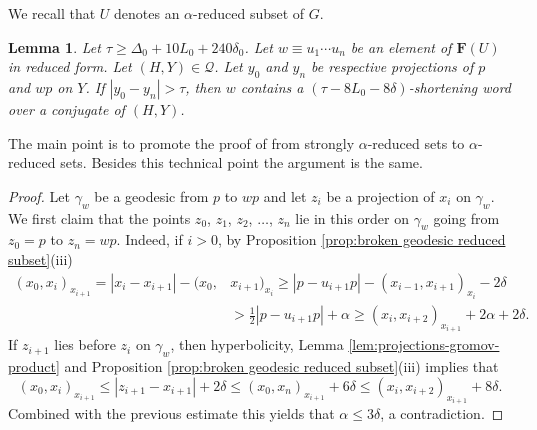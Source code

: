 \documentclass[leqno,a4paper,10pt]{amsart}
\theoremstyle{plain}
\newtheorem{lem}[thm]{Lemma}
\theoremstyle{definition}
\theoremstyle{remark}
\renewcommand{\geq}{\geqslant}
\newcommand{\F}{\mathbf{F}}
\newcommand{\scrQ}{\mathscr{Q}}
\let\geq\geqslant
\begin{document}
We recall that $U$ denotes an $\alpha$-reduced subset of $G$. 

\begin{lem}
	\label{lem:barrier implies shortening} Let $\tau\geq \Delta_0+10L_0+240\delta_0$. 
	Let $w\equiv u_1\cdots u_n$ be an element of $\F(U)$ in reduced form.  Let $(H,Y) \in \scrQ$. Let $y_0$ and $y_n$ be respective projections of $p$ and $wp$ on $Y$. If $|y_0-y_n| > \tau$,	then $w$ contains a $(\tau-8L_0-8\delta)$-shortening word over a conjugate of $(H,Y)$.
\end{lem}

The main point is to promote the proof of \cite[Proposition 4.2]{coulon_product_2022} from strongly $\alpha$-reduced sets to $\alpha$-reduced sets. Besides this technical point the argument is the same. 
 
\begin{proof} Let $\gamma_w$ be a geodesic from $p$ to $wp$ and let $z_i$ be a projection of $x_i$ on $\gamma_w$. We first claim that the points $z_0$, $z_1$, $z_2$, $\ldots$, $z_n$ lie in this order on $\gamma_w$ going from $z_0=p$ to $z_n=wp$. Indeed, if $i>0$, by Proposition \ref{prop:broken geodesic reduced subset}(iii) 
\begin{align*}
(x_0,x_i)_{x_{i+1}} = |x_i-x_{i+1}|-(x_0,&x_{i+1})_{x_i}
 \geqslant |p-u_{i+1}p|-(x_{i-1},x_{i+1})_{x_i} -2\delta \\
& > \frac{1}{2}|p-u_{i+1}p|+\alpha \geqslant (x_{i},x_{i+2})_{x_{i+1}} +2\alpha +2\delta.
\end{align*}
If $z_{i+1}$ lies before $z_i$ on $\gamma_w$, then hyperbolicity, Lemma \ref{lem:projections-gromov-product} and Proposition \ref{prop:broken geodesic reduced subset}(iii) implies that 
$$(x_0,x_i)_{x_{i+1}}\leqslant |z_{i+1}-x_{i+1}| +2\delta \leqslant (x_0,x_n)_{x_{i+1}} +6\delta\leqslant (x_{i},x_{i+2})_{x_{i+1}}+8\delta.$$
{Combined with the previous estimate this yields that $\alpha \leqslant 3\delta$, a contradiction.}


\end{proof}
\end{document}
